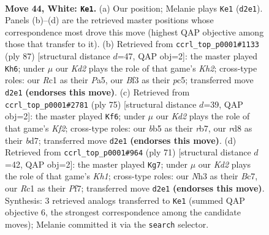 \documentclass[11pt]{article}
\begin{document}
\clearpage

\begin{figure}[p]\centering
\begin{subfigure}{0.46\textwidth}\centering
\resizebox{\linewidth}{!}{%
\newchessgame
\chessboard[
  setfen={3r2k1/5p1p/1r6/pb6/3p2P1/1P3B1N/3K2RP/2R5 w - - 2 44},
  showmover=false,
  pgfstyle=straightmove, color=movearrow, markmove={d2-e1}
]}
\caption{}
\end{subfigure}\hfill
\begin{subfigure}{0.46\textwidth}\centering
\resizebox{\linewidth}{!}{%
\newchessgame
\chessboard[
  setfen={8/6rk/2P3p1/p1P5/2B1p2p/6bP/P5P1/6RK b - - 1 44},
  showmover=false,
  pgfstyle=straightmove, color=movearrow, markmove={h7-h6}
]}
\caption{}
\end{subfigure}
\\[4pt]
\begin{subfigure}{0.46\textwidth}\centering
\resizebox{\linewidth}{!}{%
\newchessgame
\chessboard[
  setfen={5r2/1R1B1k1p/8/2rp1P1p/8/5R2/P3n1PK/8 b - - 3 38},
  showmover=false,
  pgfstyle=straightmove, color=movearrow, markmove={f7-f6}
]}
\caption{}
\end{subfigure}\hfill
\begin{subfigure}{0.46\textwidth}\centering
\resizebox{\linewidth}{!}{%
\newchessgame
\chessboard[
  setfen={3r3k/2b2p1p/2P5/3p4/5p2/8/4BPPP/4RK2 b - - 5 36},
  showmover=false,
  pgfstyle=straightmove, color=movearrow, markmove={h8-g7}
]}
\caption{}
\end{subfigure}
\caption{\textbf{Move 44, White: \texttt{Ke1}.} (a) Our position; Melanie plays \texttt{Ke1} (\texttt{d2e1}). Panels (b)--(d) are the retrieved master positions whose correspondence most drove this move (highest QAP objective among those that transfer to it). (b) Retrieved from \texttt{ccrl\_top\_p0001\#1133} (ply 87) [structural distance $d$=47, QAP obj=2]: the master played \texttt{Kh6}; under $\mu$ our \emph{Kd2} plays the role of that game's \emph{Kh2}; cross-type roles: our \emph{R}c1 as their \emph{P}a5, our \emph{B}f3 as their \emph{p}c5; transferred move \texttt{d2e1} \textbf{(endorses this move)}. (c) Retrieved from \texttt{ccrl\_top\_p0001\#2781} (ply 75) [structural distance $d$=39, QAP obj=2]: the master played \texttt{Kf6}; under $\mu$ our \emph{Kd2} plays the role of that game's \emph{Kf2}; cross-type roles: our \emph{b}b5 as their \emph{r}b7, our \emph{r}d8 as their \emph{b}d7; transferred move \texttt{d2e1} \textbf{(endorses this move)}. (d) Retrieved from \texttt{ccrl\_top\_p0001\#964} (ply 71) [structural distance $d$=42, QAP obj=2]: the master played \texttt{Kg7}; under $\mu$ our \emph{Kd2} plays the role of that game's \emph{Kh1}; cross-type roles: our \emph{N}h3 as their \emph{B}c7, our \emph{R}c1 as their \emph{P}f7; transferred move \texttt{d2e1} \textbf{(endorses this move)}. Synthesis: 3 retrieved analogs transferred to \texttt{Ke1} (summed QAP objective 6, the strongest correspondence among the candidate moves); Melanie committed it via the \texttt{search} selector.}
\label{fig:thought-m86}
\end{figure}
\end{document}
